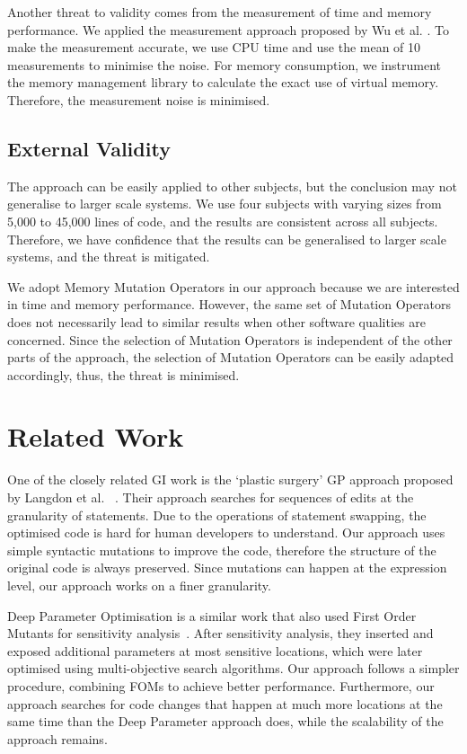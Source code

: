 \documentclass[oribibl]{llncs}
\begin{document}
{Another threat to validity comes from the measurement of time and memory performance. We applied the measurement approach proposed by Wu et al. \cite{Wu:2015:DPO:2739480.2754648}. 
To make the measurement accurate, we use CPU time and use the mean of 10 measurements to minimise the noise.
For memory consumption, we instrument the memory management library to calculate the exact use of virtual memory.
Therefore, the measurement noise is minimised.

\subsection{External Validity}
\label{sec_externalvalidity}

The approach can be easily applied to other subjects, but the conclusion may not generalise to larger scale systems.
We use four subjects with varying sizes from 5,000 to 45,000 lines of code, and the results are consistent across all subjects.
Therefore, we have confidence that the results can be generalised to larger scale systems, and the threat is mitigated.

We adopt Memory Mutation Operators in our approach because we are interested in time and memory performance.
However, the same set of Mutation Operators does not necessarily lead to similar results when other software qualities are concerned.
Since the selection of Mutation Operators is independent of the other parts of the approach, the selection of Mutation Operators can be easily adapted accordingly, thus, the threat is minimised.

\section{Related Work}
\label{sec_related}
\vspace{-2mm}
One of the closely related GI work is the `plastic surgery' GP approach proposed by Langdon et al. ~\cite{6733370,Langdon:2014:IMI:2576768.2598244}.
Their approach searches for sequences of edits at the granularity of statements. 
Due to the operations of statement swapping, the optimised code is hard for human developers to understand.
Our approach uses simple syntactic mutations to improve the code, therefore the structure of the original code is always preserved.
Since mutations can happen at the expression level, our approach works on a finer granularity.

Deep Parameter Optimisation is a similar work that also used First Order Mutants for sensitivity analysis~\cite{Wu:2015:DPO:2739480.2754648}.
After sensitivity analysis, they inserted and exposed additional parameters at most sensitive locations, which were later optimised using multi-objective search algorithms.
Our approach follows a simpler procedure, combining FOMs to achieve better performance.
Furthermore, our approach searches for code changes that happen at much more locations at the same time than the Deep Parameter approach does, while the scalability of the approach remains.

}
\end{document}
